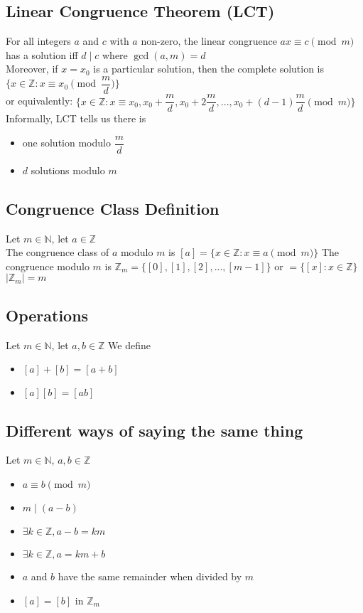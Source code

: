 \documentclass[12pt, letterpaper]{article}
\begin{document}
\subsection{Linear Congruence Theorem (LCT)}
For all integers $a$ and $c$ with $a$ non-zero, the linear congruence $ax \equiv c \pmod{m}$ has a
solution iff $d \mid c$ where $\gcd(a, m) = d$ \\
Moreover, if $x = x_0$ is a particular solution, then the complete solution is $\{x \in \mathbb{Z} : x \equiv x_0 \pmod{\dfrac{m}{d}}\}$ \\
or equivalently: $\{x \in \mathbb{Z} : x \equiv x_0, x_0 + \dfrac{m}{d}, x_0 + 2\dfrac{m}{d}, ... , x_0 + (d-1)\dfrac{m}{d} \pmod{m}\}$ \\
Informally, LCT tells us there is 
\begin{itemize}
    \item one solution modulo $\dfrac{m}{d}$ 
    \item $d$ solutions modulo $m$
\end{itemize}
\subsection{Congruence Class Definition}
Let $m \in \mathbb{N}$, let $a \in \mathbb{Z}$ \\
The congruence class of $a$ modulo $m$ is $[a] = \{x \in \mathbb{Z} : x \equiv a \pmod{m} \}$
The congruence modulo $m$ is $\mathbb{Z}_m = \{[0], [1], [2], ... , [m-1]\}$ or $= \{[x] : x \in \mathbb{Z}\}$ \\
$|\mathbb{Z}_m| = m$ 
\subsection{Operations}
Let $m \in \mathbb{N}$, let $a, b \in \mathbb{Z}$ We define 
\begin{itemize}
    \item $[a] + [b] = [a+b]$
    \item $[a][b] = [ab]$
\end{itemize}
\subsection{Different ways of saying the same thing}
Let $m \in \mathbb{N}$, $a, b \in \mathbb{Z}$ 
\begin{itemize}
    \item $a \equiv b \pmod{m}$
    \item $m \mid (a-b)$
    \item $\exists k \in \mathbb{Z}, a-b = km$
    \item $\exists k \in \mathbb{Z}, a = km + b$
    \item $a$ and $b$ have the same remainder when divided by $m$
    \item $[a] = [b]$ in $\mathbb{Z}_m$
\end{itemize}
\end{document}
